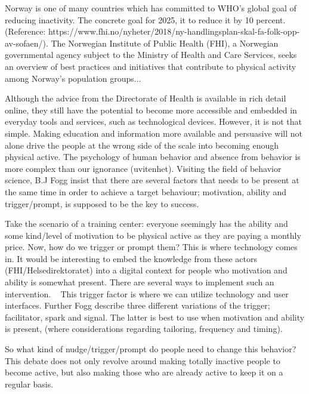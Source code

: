 Norway is one of many countries which has committed to WHO's global goal of reducing inactivity. The concrete goal for 2025, it to reduce it by 10 percent. (Reference: https://www.fhi.no/nyheter/2018/ny-handlingsplan-skal-fa-folk-opp-av-sofaen/). The Norwegian Institute of Public Health (FHI), a Norwegian governmental agency subject to the Ministry of Health and Care Services, seeks an overview of best practices and initiatives that contribute to physical activity among Norway's population groups...

Although the advice from the Directorate of Health is available in rich detail online, they still have the potential to become more accessible and embedded in everyday tools and services, such as technological devices. However, it is not that simple. Making education and information more available and persuasive will not alone drive the people at the wrong side of the scale into becoming enough physical active. The psychology of human behavior and absence from behavior is more complex than our ignorance (uvitenhet). Visiting the field of behavior science, B.J Fogg insist that there are several factors that needs to be present at the same time in order to achieve a target behaviour; motivation, ability and trigger/prompt, is supposed to be the key to success. 

Take the scenario of a training center: everyone seemingly has the ability and some kind/level of motivation to be physical active as they are paying a monthly price. Now, how do we trigger or prompt them?  This is where technology comes in. It would be interesting to embed the knowledge from these actors (FHI/Helsedirektoratet) into a digital context for people who motivation and ability is somewhat present. There are several ways to implement such an intervention. 
 
This trigger factor is where we can utilize technology and user interfaces. Further Fogg describe three different variations of the trigger; facilitator, spark and signal. The latter is best to use when motivation and ability is present, (where considerations regarding tailoring, frequency and timing).


So what kind of nudge/trigger/prompt do people need to change this behavior? This debate does not only revolve around making totally inactive people to become active, but also making those who are already active to keep it on a regular basis. 

